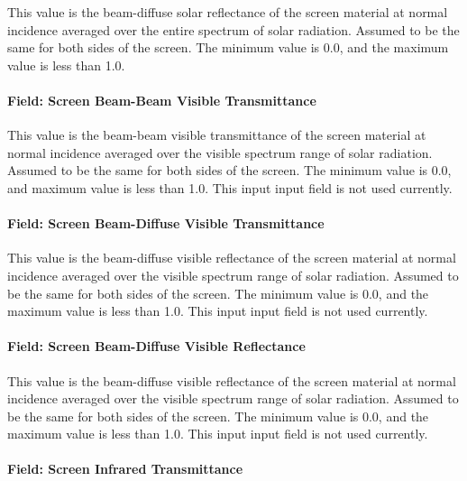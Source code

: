 This value is the beam-diffuse solar reflectance of the screen material at normal incidence averaged over the entire spectrum of solar radiation. Assumed to be the same for both sides of the screen. The minimum value is 0.0, and the maximum value is less than 1.0.

\paragraph{Field: Screen Beam-Beam Visible Transmittance}\label{field-screen-beam-beam-visible-transmittance}

This value is the beam-beam visible transmittance of the screen material at normal incidence averaged over the visible spectrum range of solar radiation.~ Assumed to be the same for both sides of the screen. The minimum value is 0.0, and maximum value is less than 1.0. This input input field is not used currently.

\paragraph{Field: Screen Beam-Diffuse Visible Transmittance}\label{field-screen-beam-diffuse-visible-transmittance}

This value is the beam-diffuse visible reflectance of the screen material at normal incidence averaged over the visible spectrum range of solar radiation. Assumed to be the same for both sides of the screen. The minimum value is 0.0, and the maximum value is less than 1.0. This input input field is not used currently.

\paragraph{Field: Screen Beam-Diffuse Visible Reflectance}\label{field-screen-beam-diffuse-visible-reflectance}

This value is the beam-diffuse visible reflectance of the screen material at normal incidence averaged over the visible spectrum range of solar radiation. Assumed to be the same for both sides of the screen. The minimum value is 0.0, and the maximum value is less than 1.0. This input input field is not used currently.

\paragraph{Field: Screen Infrared Transmittance}\label{field-screen-infrared-transmittance}

